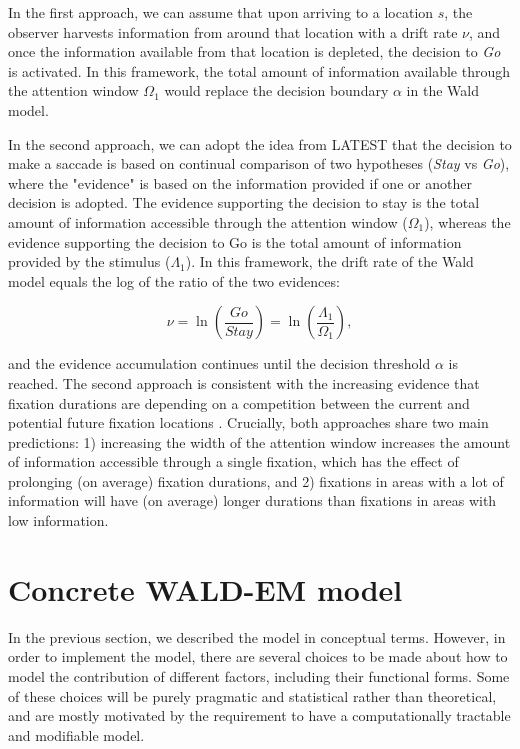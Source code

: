 \documentclass{article}
\begin{document}
In the first approach, we can assume that upon arriving to a location $s$, the observer harvests information from around that location with a drift rate $\nu$, and once the information available from that location is depleted, the decision to \textit{Go} is activated. In this framework, the total amount of information available through the attention window $\Omega_1$ would replace the decision boundary $\alpha$ in the Wald model.

In the second approach, we can adopt the idea from LATEST \citep{tatler2017latest} that the decision to make a saccade is based on continual comparison of two hypotheses (\textit{Stay} vs \textit{Go}), where the "evidence" is based on the information provided if one or another decision is adopted. The evidence supporting the decision to stay is the total amount of information accessible through the attention window ($\Omega_1$), whereas the evidence supporting the decision to Go is the total amount of information provided by the stimulus ($\Lambda_1$). In this framework, the drift rate of the Wald model equals the log of the ratio of the two evidences:

\begin{equation}
\nu = \ln\left(\frac{Go}{Stay}\right) = \ln\left(\frac{\Lambda_1}{\Omega_1}\right),
\end{equation}

and the evidence accumulation continues until the decision threshold $\alpha$ is reached. The second approach is consistent with the increasing evidence that fixation durations are depending on a competition between the current and potential future fixation locations \citep{einhauser2020fixation}. Crucially, both approaches share two main predictions: 1) increasing the width of the attention window increases the amount of information accessible through a single fixation, which has the effect of prolonging (on average) fixation durations, and 2) fixations in areas with a lot of information will have (on average) longer durations than fixations in areas with low information.

\section{Concrete WALD-EM model}

In the previous section, we described the model in conceptual terms. However, in order to implement the model, there are several choices to be made about how to model the contribution of different factors, including their functional forms. Some of these choices will be purely pragmatic and statistical rather than theoretical, and are mostly motivated by the requirement to have a computationally tractable and modifiable model.
\end{document}
